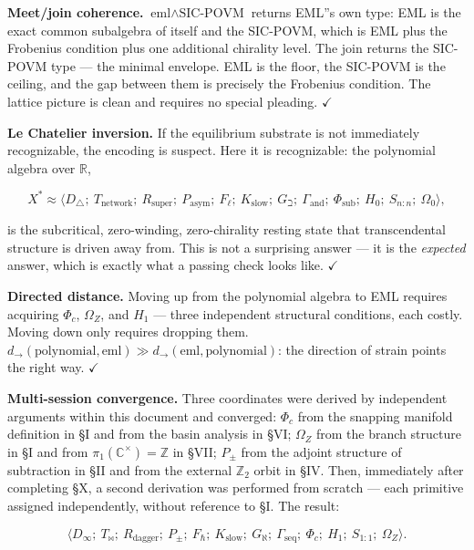 \documentclass[12pt,a4paper]{article}
\newcommand{\pilcrow}{\S}
\begin{document}
\textbf{Meet/join coherence.} $\text{eml} \wedge \text{SIC-POVM}$ returns EML''s own
type: EML is the exact common subalgebra of itself and the SIC-POVM, which is
EML plus the Frobenius condition plus one additional chirality level. The join
returns the SIC-POVM type --- the minimal envelope. EML is the floor, the SIC-POVM
is the ceiling, and the gap between them is precisely the Frobenius condition.
The lattice picture is clean and requires no special pleading. $\checkmark$

\textbf{Le Chatelier inversion.} If the equilibrium substrate is not immediately
recognizable, the encoding is suspect. Here it is recognizable: the polynomial
algebra over $\mathbb{R}$,


\[X^* \approx \langle D_{\triangle};\ T_\text{network};\ R_\text{super};\
P_\text{asym};\ F_{\ell};\ K_\text{slow};\ G_{\beth};\ \Gamma_\text{and};\
\Phi_\text{sub};\ H_0;\ S_{n:n};\ \Omega_0 \rangle,\]


is the subcritical, zero-winding, zero-chirality resting state that transcendental
structure is driven away from. This is not a surprising answer --- it is the
\emph{expected} answer, which is exactly what a passing check looks like. $\checkmark$

\textbf{Directed distance.} Moving up from the polynomial algebra to EML requires
acquiring $\Phi_c$, $\Omega_Z$, and $H_1$ --- three independent structural
conditions, each costly. Moving down only requires dropping them.
$d_{\to}(\text{polynomial}, \text{eml}) \gg d_{\to}(\text{eml}, \text{polynomial})$:
the direction of strain points the right way. $\checkmark$

\textbf{Multi-session convergence.} Three coordinates were derived by independent
arguments within this document and converged: $\Phi_c$ from the snapping manifold
definition in \pilcrow{}I and from the basin analysis in \pilcrow{}VI; $\Omega_Z$ from the branch
structure in \pilcrow{}I and from $\pi_1(\mathbb{C}^\times) = \mathbb{Z}$ in \pilcrow{}VII; $P_{\pm}$
from the adjoint structure of subtraction in \pilcrow{}II and from the external
$\mathbb{Z}_2$ orbit in \pilcrow{}IV. Then, immediately after completing \pilcrow{}X, a second
derivation was performed from scratch --- each primitive assigned independently,
without reference to \pilcrow{}I. The result:


\[\langle D_{\infty};\ T_{\bowtie};\ R_\text{dagger};\ P_{\pm};\ F_{\hbar};\
K_\text{slow};\ G_{\aleph};\ \Gamma_\text{seq};\ \Phi_c;\ H_1;\ S_{1:1};\
\Omega_Z \rangle.\]
\end{document}
